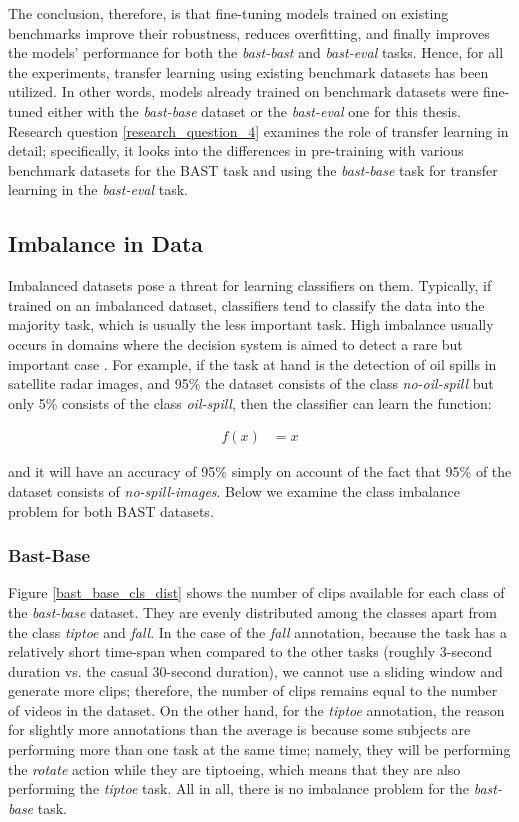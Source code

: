 \documentclass[extern,palatino]{cgMA}
\begin{document}
\noindent The conclusion, therefore, is that fine-tuning models trained on existing benchmarks improve their robustness, reduces overfitting, and finally improves the models' performance for both the \textit{bast-bast} and \textit{bast-eval} tasks. Hence, for all the experiments, transfer learning using existing benchmark datasets has been utilized. In other words, models already trained on benchmark datasets were fine-tuned either with the \textit{bast-base} dataset or the \textit{bast-eval} one for this thesis. Research question \ref{research_question_4} examines the role of transfer learning in detail; specifically, it looks into the differences in pre-training with various benchmark datasets for the BAST task and using the \textit{bast-base} task for transfer learning in the \textit{bast-eval} task.

\subsection{Imbalance in Data}
\label{imbalance_data}
Imbalanced datasets pose a threat for learning classifiers on them. Typically, if trained on an imbalanced dataset, classifiers tend to classify the data into the majority task, which is usually the less important task. High imbalance usually occurs in domains where the decision system is aimed to detect a rare but important case \cite{kotsiantis2006handling}. For example, if the task at hand is the detection of oil spills in satellite radar images, and 95\% the dataset consists of the class \textit{no-oil-spill} but only 5\% consists of the class \textit{oil-spill}, then the classifier can learn the function:

\begin{align*}
    f(x) &= x
\end{align*}

\noindent and it will have an accuracy of 95\% simply on account of the fact that 95\% of the dataset consists of \textit{no-spill-images}. Below we examine the class imbalance problem for both BAST datasets.

\subsubsection{Bast-Base}
Figure \ref{bast_base_cls_dist} shows the number of clips available for each class of the \textit{bast-base} dataset. They are evenly distributed among the classes apart from the class \textit{tiptoe} and \textit{fall}. In the case of the \textit{fall} annotation, because the task has a relatively short time-span when compared to the other tasks (roughly 3-second duration vs. the casual 30-second duration), we cannot use a sliding window and generate more clips; therefore, the number of clips remains equal to the number of videos in the dataset. On the other hand, for the \textit{tiptoe} annotation, the reason for slightly more annotations than the average is because some subjects are performing more than one task at the same time; namely, they will be performing the \textit{rotate} action while they are tiptoeing, which means that they are also performing the \textit{tiptoe} task. All in all, there is no imbalance problem for the \textit{bast-base} task.
\end{document}

